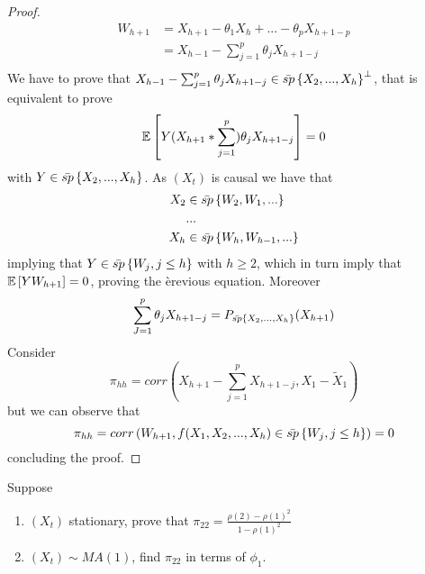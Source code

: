 \begin{proof}
    \begin{equation*}
        \begin{split}
            W_{h+1}&=X_{h+1}-\theta_1X_h+...-\theta_pX_{h+1-p}\\
            &=X_{h-1}-\sum_{j=1}^p\theta_jX_{h+1-j}\\
        \end{split}
    \end{equation*}
    We have to prove that $X_{h-1}-\sum_{j=1}^p\theta_jX_{h+1-j}\in\bar{sp}\left\{X_2,...,X_h\right\}^\perp$, that is equivalent to prove
    \[
        \mathbb{E}\left[Y(X_{h+1}*\sum_{j=1}^p)\theta_jX_{h+1-j}\right]=0  
    \]
    with $Y\in\bar{sp}\left\{X_2,...,X_h\right\}$. As $(X_t)$ is causal we have that
    \begin{equation*}
        \begin{split}
            X_2&\in\bar{sp}\left\{W_2,W_1,...\right\}\\
            &...\\
            X_h&\in\bar{sp}\left\{W_h,W_{h-1},...\right\}\\
        \end{split}
    \end{equation*}
    implying that $Y\in\bar{sp}\left\{W_j,j\le h\right\}$ with $h\ge2$, which in turn imply that $\mathbb{E}\left[YW_{h+1}\right]=0$, proving the èrevious equation. Moreover
    \[
        \sum_{J=1}^p\theta_jX_{h+1-j}=P_{\bar{sp}\left\{X_2,...,X_h\right\}}(X_{h+1})
    \]
    Consider
    \[  
        \pi_{hh}=corr\left(X_{h+1}-\sum_{j=1}^pX_{h+1-j},X_1-\tilde{X}_1\right)
    \]
    but we can observe that
    \[
        \pi_{hh}=corr\left(W_{h+1},f(X_1,X_2,...,X_h)\in\bar{sp}\left\{W_j,j\le h\right\}\right)=0
    \]
    concluding the proof.
\end{proof}

\begin{exercise}
    Suppose
    \begin{enumerate}
        \item $(X_t)$ stationary, prove that $\pi_{22}=\frac{\rho(2)-\rho(1)^2}{1-\rho(1)^2}$
        \item $(X_t)\sim MA(1)$, find $\pi_{22}$ in terms of $\phi_1$. 
    \end{enumerate}
\end{exercise}

